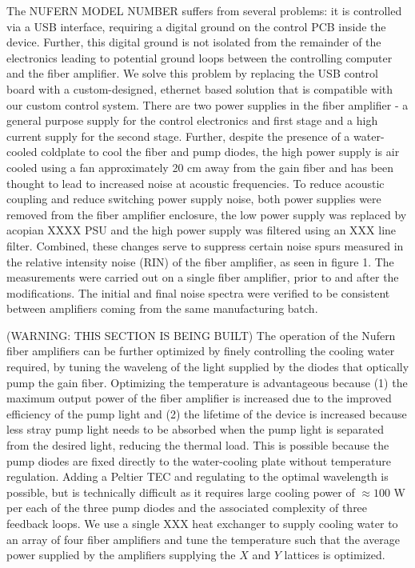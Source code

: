 \documentclass[twocolumn,aps,pra,showpacs,preprintnumbers,bibnotes]{revtex4-1}
\begin{document}
The NUFERN MODEL NUMBER suffers from several problems: it is controlled via a USB interface, requiring a digital ground on the control PCB inside the device. Further, this digital ground is not isolated from the remainder of the electronics leading to potential ground loops between the controlling computer and the fiber amplifier. 
We solve this problem by replacing the USB control board with a custom-designed, ethernet based solution that is compatible with our custom control system. 
There are two power supplies in the fiber amplifier - a general purpose supply for the control electronics and first stage and a high current supply for the second stage. 
Further, despite the presence of a water-cooled coldplate to cool the fiber and pump diodes, the high power supply is air cooled using a fan approximately 20 cm away from the gain fiber and has been thought to lead to increased noise at acoustic frequencies.
To reduce acoustic coupling and reduce switching power supply noise, both power supplies were removed from the fiber amplifier enclosure, the low power supply was replaced by acopian XXXX PSU and the high power supply was filtered using an XXX line filter.
Combined, these changes serve to suppress certain noise spurs measured in the relative intensity noise (RIN) of the fiber amplifier, as seen in figure 1. 
The measurements were carried out on a single fiber amplifier, prior to and after the modifications. The initial and final noise spectra were verified to be consistent between amplifiers coming from the same manufacturing batch.

(WARNING: THIS SECTION IS BEING BUILT) The operation of the Nufern fiber amplifiers can be further optimized by finely controlling the cooling water required, by tuning the waveleng of the light supplied by the diodes that optically pump the gain fiber.
Optimizing the temperature is advantageous because (1) the maximum output power of the fiber amplifier is increased due to the improved efficiency of the pump light and (2) the lifetime of the device is increased because less stray pump light needs to be absorbed when the pump light is separated from the desired light, reducing the thermal load. 
This is possible because the pump diodes are fixed directly to the water-cooling plate without temperature regulation.
Adding a Peltier TEC and regulating to the optimal wavelength is possible, but is technically difficult as it requires large cooling power of $\approx100$ W per each of the three pump diodes and the associated complexity of three feedback loops.
We use a single XXX heat exchanger to supply cooling water to an array of four fiber amplifiers and tune the temperature such that the average power supplied by the amplifiers supplying the $X$ and $Y$ lattices is optimized.
\end{document}
